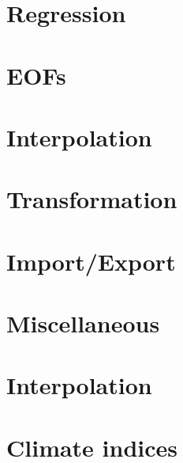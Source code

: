 \newpage
\section{Regression}




\newpage
\section{EOFs}




\newpage
\section{Interpolation}




\newpage
\section{Transformation}




\newpage
\section{Import/Export}




\newpage
\section{Miscellaneous}




\newpage
\section{Interpolation}




\newpage
\section{Climate indices}




